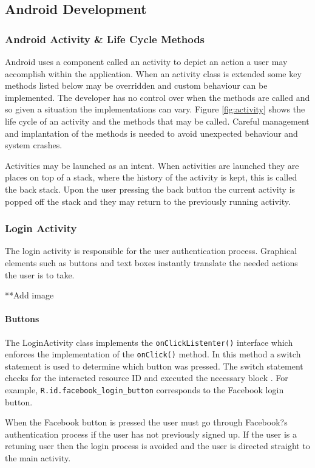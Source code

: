 \documentclass[a4paper, 11pt]{article}
\begin{document}
\subsection{Android Development} 

\subsubsection{Android Activity \& Life Cycle Methods}
Android uses a component called an activity to depict an action a user may accomplish within the application. When an activity class is extended some key methods listed below may be overridden and custom behaviour can be implemented. The developer has no control over when the methods are called and so given a situation the implementations can vary. Figure \ref{fig:activity} shows the life cycle of an activity and the methods that may be called. Careful management and implantation of the methods is needed to avoid unexpected behaviour and system crashes.

Activities may be launched as an intent. When activities are launched they are places on top of a stack, where the history of the activity is kept, this is called the back stack. Upon the user pressing the back button the current activity is popped off the stack and they may return to the previously running activity. 


\subsubsection{Login Activity}
The login activity is responsible for the user authentication process. Graphical elements such as buttons and text boxes instantly translate the needed actions the user is to take. 

**Add image

\paragraph{Buttons}
The LoginActivity class implements the \texttt{onClickListenter()} interface which enforces the implementation of the \texttt{onClick()} method. In this method a switch statement is used to determine which button was pressed. The switch statement checks for the interacted resource ID and executed the necessary block . For example, \texttt{R.id.facebook\_login\_button} corresponds to the Facebook login button. 

When the Facebook button is pressed the  user must go through Facebook?s authentication process if the user has not previously signed up. If the user is a retuning user then the login process is avoided and the user is directed straight to the main activity.  
\end{document}
